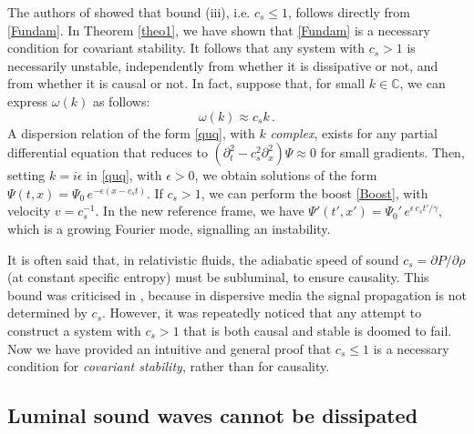 \documentclass[a4paper, amsfonts, amssymb, amsmath, reprint, showkeys, nofootinbib, twoside,notitlepage]{revtex4-1}
\theoremstyle{definition}
\theoremstyle{theorem}
\theoremstyle{corollary}
\begin{document}
The authors of \cite{Heller2022} showed that bound (iii), i.e. $c_s \leq 1$, follows directly from \eqref{Fundam}. In Theorem \ref{theo1}, we have shown that \eqref{Fundam} is a necessary condition for covariant stability. It follows that any system with $c_s>1$ is necessarily unstable, independently from whether it is dissipative or not, and from whether it is causal or not. In fact, suppose that, for small $k \in \mathbb{C}$, we can express $\omega(k)$ as follows:
\begin{equation}\label{quq}
\omega(k) \approx c_s k  \, .
\end{equation}
A dispersion relation of the form \eqref{quq}, with $k$ \textit{complex}, exists for any partial differential equation that reduces to $(\partial^2_t -c_s^2 \partial^2_x)\Psi \approx 0$ for small gradients.
Then, setting $k=i \epsilon$ in \eqref{quq}, with $\epsilon >0$, we obtain solutions of the form $\Psi(t,x)=\Psi_0 \, e^{-\epsilon (x-c_s t)}$. If $c_s>1$, we can perform the boost \eqref{Boost}, with velocity $v=c_s^{-1}$. In the new reference frame, we have
$\Psi'(t',x')= \Psi_0' \, e^{\epsilon \, c_s t'/\gamma}$, which is a growing Fourier mode, signalling an instability.

It is often said that, in relativistic fluids, the adiabatic speed of sound $c_s=\partial P/\partial \rho$ (at constant specific entropy) must be subluminal, to ensure causality. This bound was criticised in \cite{FoxKuper1970,Caporaso1979}, because in dispersive media the signal propagation is not determined by $c_s$. However, it was repeatedly noticed \cite{Bludman1970,Krotscheck1978,Adams2006,Camelio2022} that any attempt to construct a system with $c_s>1$ that is both causal and stable is doomed to fail. Now we have provided an intuitive and general proof that $c_s \leq 1$ is a necessary condition for \textit{covariant stability}, rather than for causality.

\subsection{Luminal sound waves cannot be dissipated}
\end{document}
